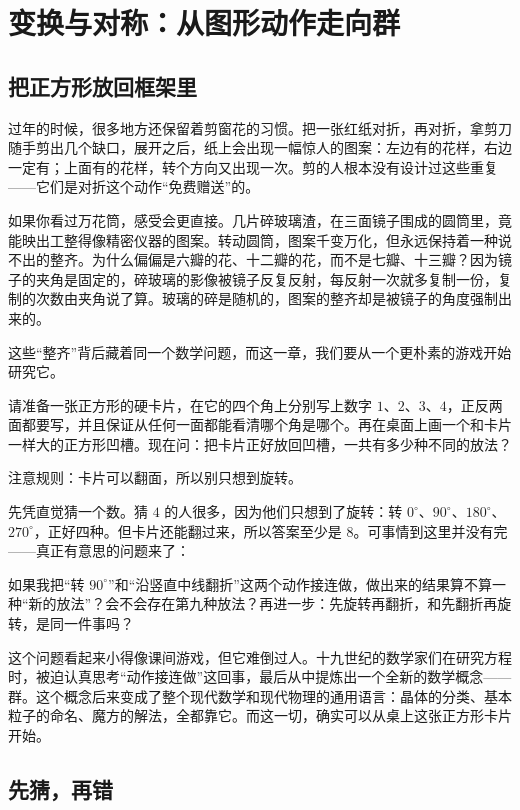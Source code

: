 \chapter{变换与对称：从图形动作走向群}

\section{把正方形放回框架里}

过年的时候，很多地方还保留着剪窗花的习惯。把一张红纸对折，再对折，拿剪刀随手剪出几个缺口，展开之后，纸上会出现一幅惊人的图案：左边有的花样，右边一定有；上面有的花样，转个方向又出现一次。剪的人根本没有设计过这些重复——它们是对折这个动作“免费赠送”的。

如果你看过万花筒，感受会更直接。几片碎玻璃渣，在三面镜子围成的圆筒里，竟能映出工整得像精密仪器的图案。转动圆筒，图案千变万化，但永远保持着一种说不出的整齐。为什么偏偏是六瓣的花、十二瓣的花，而不是七瓣、十三瓣？因为镜子的夹角是固定的，碎玻璃的影像被镜子反复反射，每反射一次就多复制一份，复制的次数由夹角说了算。玻璃的碎是随机的，图案的整齐却是被镜子的角度强制出来的。

这些“整齐”背后藏着同一个数学问题，而这一章，我们要从一个更朴素的游戏开始研究它。

请准备一张正方形的硬卡片，在它的四个角上分别写上数字 $1$、$2$、$3$、$4$，正反两面都要写，并且保证从任何一面都能看清哪个角是哪个。再在桌面上画一个和卡片一样大的正方形凹槽。现在问：把卡片正好放回凹槽，一共有多少种不同的放法？

注意规则：卡片可以翻面，所以别只想到旋转。

先凭直觉猜一个数。猜 $4$ 的人很多，因为他们只想到了旋转：转 $0^\circ$、$90^\circ$、$180^\circ$、$270^\circ$，正好四种。但卡片还能翻过来，所以答案至少是 $8$。可事情到这里并没有完——真正有意思的问题来了：

如果我把“转 $90^\circ$”和“沿竖直中线翻折”这两个动作接连做，做出来的结果算不算一种“新的放法”？会不会存在第九种放法？再进一步：先旋转再翻折，和先翻折再旋转，是同一件事吗？

这个问题看起来小得像课间游戏，但它难倒过人。十九世纪的数学家们在研究方程时，被迫认真思考“动作接连做”这回事，最后从中提炼出一个全新的数学概念——群。这个概念后来变成了整个现代数学和现代物理的通用语言：晶体的分类、基本粒子的命名、魔方的解法，全都靠它。而这一切，确实可以从桌上这张正方形卡片开始。

\section{先猜，再错}

